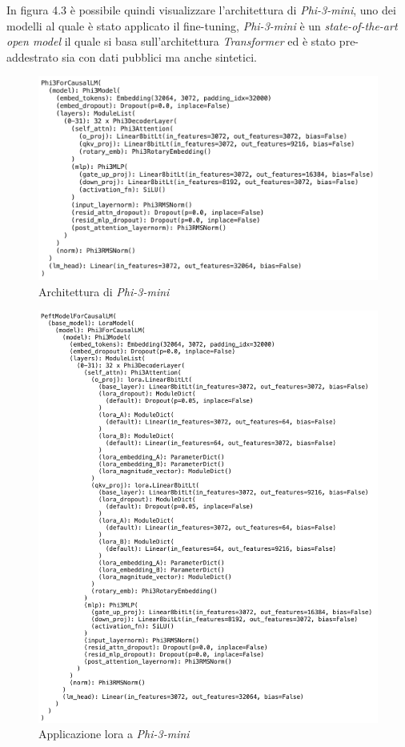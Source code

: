 In figura 4.3 è possibile quindi visualizzare l'architettura di \textit{Phi-3-mini}, uno dei modelli al quale è stato applicato il \gls{fine-tuning}, \textit{Phi-3-mini} è un \textit{state-of-the-art open model} il quale si basa sull'architettura \textit{Transformer} ed è stato pre-addestrato sia con dati pubblici ma anche sintetici. 
    \begin{figure}[!h]
        \centering        
        \includegraphics[width=14.5cm]{img/Phi3.pdf}
        \caption{Architettura di \textit{Phi-3-mini}}
    \end{figure}

    \begin{figure}[!h]
        \centering        
        \includegraphics[width=14.5cm]{img/LoRA.pdf}
        \caption{Applicazione \gls{lora} a \textit{Phi-3-mini}}
    \end{figure}\newpage
    
